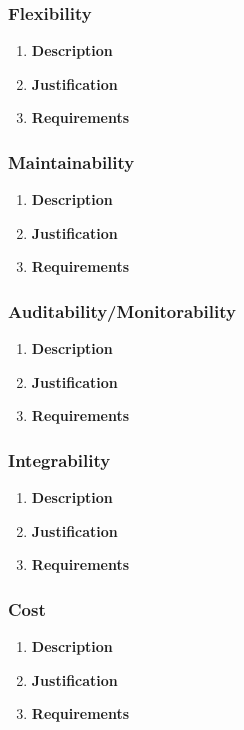 \documentclass[a4paper,10pt]{article}
\begin{document}
\subsubsection{Flexibility}
\begin{enumerate}
\item \textbf{Description} \\
\item \textbf{Justification} \\

\item \textbf{Requirements}
\end{enumerate}
\subsubsection{Maintainability}
\begin{enumerate}
\item \textbf{Description} \\
\item \textbf{Justification} \\
\item \textbf{Requirements}
\end{enumerate}
\subsubsection{Auditability/Monitorability}
\begin{enumerate}
\item \textbf{Description} \\
\item \textbf{Justification} \\
\item \textbf{Requirements}
\end{enumerate}
\subsubsection{Integrability}
\begin{enumerate}
\item \textbf{Description} \\
\item \textbf{Justification} \\
\item \textbf{Requirements}
\end{enumerate}
\subsubsection{Cost}
\begin{enumerate}
\item \textbf{Description} \\
\item \textbf{Justification} \\
\item \textbf{Requirements}
\end{enumerate}
\end{document}
